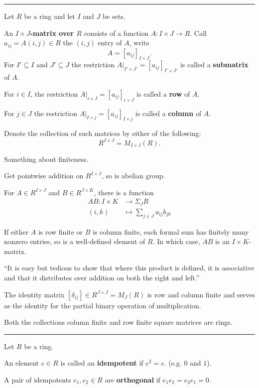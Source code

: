 \documentclass[12pt]{article}
\newcommand{\keyword}[1]{\textbf{#1}}
\newcommand{\sepline}{\rule{\textwidth}{0.4pt}}
\theoremstyle{definition}
\newcommand{\<}{\left\langle}
\renewcommand{\>}{\right\rangle}
\newcommand{\seq}{\subseteq}
\newcommand{\To}{\longrightarrow}
\newcommand{\Mapsto}{\longmapsto}
\renewcommand{\_}[1]{{_{#1}}}
\begin{document}
\sepline

Let $R$ be a ring and let $I$ and $J$ be sets.

An \keyword{$I \times J$-matrix over $R$} consists of a function $A : I \times J \to R$.
Call $a_{ij} = A(i, j) \in R$ the $(i, j)$ entry of $A$, write
\[
    A = [a_{ij}]_{I \times J}.
\]
For $I' \seq I$ and $J' \seq J$ the restriction $A|_{I' \times J'} = [a_{ij}]_{I' \times J'}$ is called a \keyword{submatrix} of $A$.

For $i \in I$, the restriction $A|_{i \times J} = [a_{ij}]_{i \times J}$ is called a \keyword{row} of $A$.

For $j \in J$ the restriction $A|_{I \times j} = [a_{ij}]_{I \times j}$ is called a \keyword{column} of $A$.

Denote the collection of such matrices by either of the following:
\[
    R^{I \times J} = M_{I \times J}(R).
\]

Something about finiteness.

Get pointwise addition on $R^{I \times J}$, so is abelian group.

For $A \in R^{I \times J}$ and $B \in R^{J \times K}$, there is a function
\begin{align*}
    AB : I \times K &\To \Sigma_J R \\
        (i, k) &\Mapsto \sum_{j \in J} a_{ij}b_{jk}
\end{align*}

If either $A$ is row finite or $B$ is column finite, each formal sum has finitely many nonzero entries, so is a well-defined element of $R$.
In which case, $AB$ is an $I \times K$-matrix.

``It is easy but tedious to show that where this product is defined, it is associative and that it distributes over addition on both the right and left.''

The identity matrix $[\delta_{ij}] \in R^{J \times J} = M_J(R)$ is row and column finite and serves as the identity for the partial binary operation of multiplication.

Both the collections column finite and row finite square matrices are rings.

\sepline

Let $R$ be a ring.

An element $e \in R$ is called an \keyword{idempotent} if $e^2 = e$.
(e.g. $0$ and $1$).

A pair of idempotents $e_1, e_2 \in R$ are \keyword{orthogonal} if $e_1e_2 = e_2e_1 = 0$.
\end{document}
